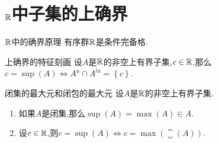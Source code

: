 \section{\texorpdfstring{$\mathbb{R}$}{R}中子集的上确界}

\begin{theorem}{$\mathbb{R}$中的确界原理}{}
	有序群$\mathbb{R}$是条件完备格.
\end{theorem}

\begin{proposition}{上确界的特征刻画}{}
	设$A$是$\mathbb{R}$的非空上有界子集,$c\in\mathbb{R}$,那么$c=\sup\left(A\right)\iff A^{u}\cap A^{lu}=\left\{c\right\}$.
\end{proposition}

\begin{proposition}{闭集的最大元和闭包的最大元}{}
	设$A$是$\mathbb{R}$的非空上有界子集.
	\begin{enumerate}
		\item 如果$A$是闭集,那么$\sup\left(A\right)=\max\left(A\right)\in A$.
		\item 设$c\in\mathbb{R}$,则$c=\sup\left(A\right)\iff c=\max\left(\closure\left(A\right)\right)$.
	\end{enumerate}
\end{proposition}
